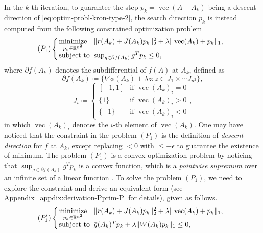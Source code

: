 \documentclass[letterpaper,10pt,journal,final]{IEEEtran}
\theoremstyle{definition}
\theoremstyle{remark}
\newcommand{\kvec}{\operatorname{vec}}
\newcommand{\minimize}[1]{\underset{#1}{\operatorname{minimize}}}  \newcommand{\st}{\operatorname{subject\ to}}
\begin{document}
In the $k$-th iteration, to guarantee the step $p_k = \kvec(A-A_k)$ being a descent direction of \eqref{eq:optim-probl-kron-type-2}, the search direction $p_k$ is instead computed from the following constrained optimization problem
\begin{equation*}
(P_1) \left\{
  \begin{array}{@{\,}l@{\;\;}l}
    \minimize{p_k \in \mathbb{R}^{n^2}} &\|r(A_k) + J(A_k) p_k\|_2^2 + \lambda \|\kvec(A_k) + p_k\|_1,\\
    \st & \sup_{g \in \partial f(A_k)} g^T p_k \leq 0,
  \end{array}
  \right.
\end{equation*}
where $\partial f(A_k)$ denotes the subdifferential of $f(A)$ at $A_k$, defined as
\begin{equation}
  \label{eq:subgradient-f-Ak}
  \partial f(A_k) \coloneqq \{ \nabla \phi(A_k) + \lambda z : z \in J_1 \times \cdots J_{n^2} \},
\end{equation}
\begin{equation}
  \label{eq:subgradient-Ji}
  J_i \coloneqq
  \begin{cases}
    [-1, 1] &  \text{if } \kvec(A_k)_i = 0 \\
    \{1\}   &  \text{if } \kvec(A_k)_i > 0 \\
    \{-1\}  &  \text{if } \kvec(A_k)_i < 0
  \end{cases},
\end{equation}
in which $\kvec(A_k)_i$ denotes the $i$-th element of $\kvec(A_k)$.
One may have noticed that the constraint in the problem $(P_1)$ is the definition of \emph{descent direction} for $f$ at $A_k$, except replacing $< 0$ with $\leq -\epsilon$ to guarantee the existence of minimum. The problem $(P_1)$ is a convex optimization problem by noticing that $\sup_{g \in \partial f(A_k)} g^T p_k$ is a convex function, which is a \emph{pointwise supremum} over an infinite set of a linear function \cite[chap.~3]{Boyd2004}.
To solve the problem $(P_1)$, we need to explore the constraint and derive an equivalent form (see Appendix~\ref{appdix:derivation-Pprim-P} for details), given as follows.
\begin{equation*}
  (P_1') \left\{
  \begin{array}{@{\,}l@{\;\;}l}
    \minimize{p_k \in \mathbb{R}^{n^2}} &\|r(A_k) + J(A_k) p_k\|_2^2 + \lambda \|\kvec(A_k) + p_k\|_1,\\
    \st & \bar{g}(A_k)^T p_k + \lambda \|W(A_k) p_k\|_1 \leq 0,
  \end{array}
  \right.
\end{equation*}
\end{document}
